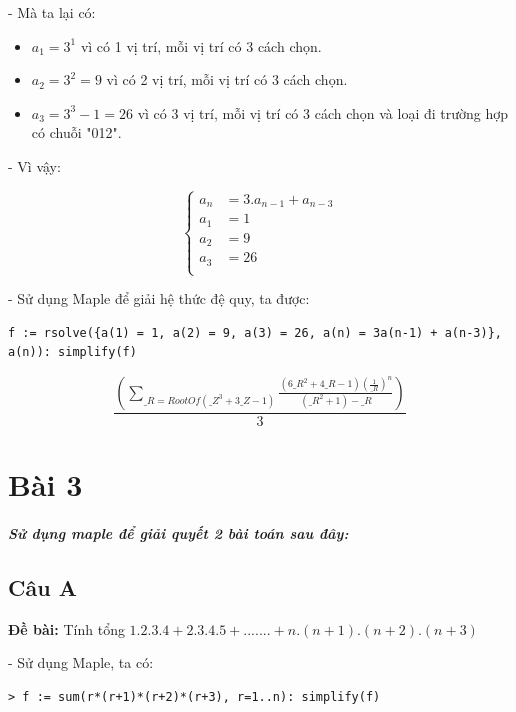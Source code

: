 \documentclass[12pt]{article}
\begin{document}
\begin{sloppypar}
- Mà ta lại có:

\begin{itemize}
    \item \(a_{1} = 3^{1}\) vì có 1 vị trí, mỗi vị trí có 3 cách chọn.
    \item \(a_{2} = 3^{2} = 9\) vì có 2 vị trí, mỗi vị trí có 3 cách chọn.
    \item \(a_{3} = 3^{3} - 1 = 26\) vì có 3 vị trí, mỗi vị trí có 3 cách chọn và loại đi trường hợp có chuỗi "012".
\end{itemize}

- Vì vậy:

\[
    \begin{cases}
        a_{n} & = 3.a_{n-1} + a_{n-3}\\             
        a_{1} & = 1 \\
        a_{2} & = 9 \\
        a_{3} & = 26 \\
    \end{cases} 
    \]


- Sử dụng Maple để giải hệ thức đệ quy, ta được:


\begin{lstlisting}[breaklines]
    f := rsolve({a(1) = 1, a(2) = 9, a(3) = 26, a(n) = 3a(n-1) + a(n-3)}, a(n)): simplify(f)
\end{lstlisting}

\begin{equation*}
    \frac{\left(\sum_{\_R = RootOf(\_Z^{3} + 3\_Z - 1)}\frac{(6\_R^{2} + 4\_R  - 1)(\frac{1}{\_R})^{n}}{(\_R^{2} + 1) - \_R}\right)}{3}
\end{equation*}

\section{Bài 3}
\subparagraph {Sử dụng maple để giải quyết 2 bài toán sau đây:}

\subsection{Câu A}
\begin{tcolorbox}
    \textbf{Đề bài:} Tính tổng \(1.2.3.4 + 2.3.4.5 + ....... + n.(n+1).(n+2).(n+3)\)
\end{tcolorbox}

- Sử dụng Maple, ta có:

\begin{verbatim}
> f := sum(r*(r+1)*(r+2)*(r+3), r=1..n): simplify(f)
\end{verbatim}


\end{sloppypar}
\end{document}
